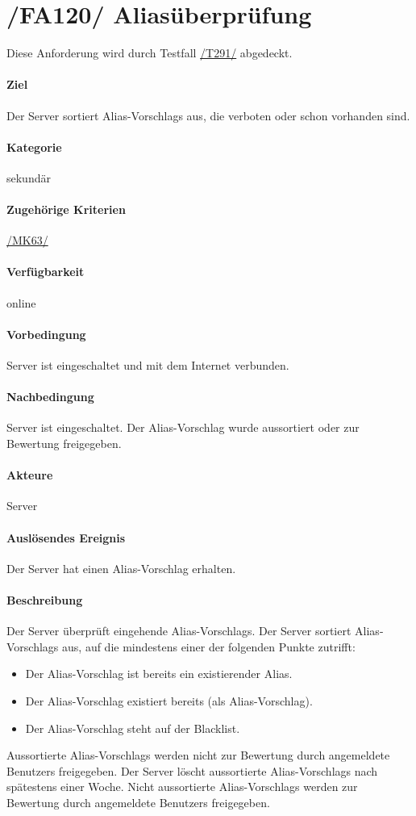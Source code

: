 \section[Aliasüberprüfung]{/FA120/ Aliasüberprüfung}
\label{/FA120/}
Diese Anforderung wird durch Testfall \hyperref[/T291/]{/T291/} abgedeckt.
\paragraph{Ziel}
Der \Gls{Server} sortiert \Glspl{Alias-Vorschlag} aus, die verboten oder schon vorhanden sind.
\paragraph{Kategorie}
sekundär
\paragraph{Zugehörige Kriterien}
\hyperref[/MK63/]{/MK63/}
\paragraph{Verfügbarkeit}
online
\paragraph{Vorbedingung}
\Gls{Server} ist eingeschaltet und mit dem Internet verbunden.
\paragraph{Nachbedingung}
\Gls{Server} ist eingeschaltet. Der \Gls{Alias-Vorschlag} wurde aussortiert oder zur Bewertung freigegeben.
\paragraph{Akteure}
\Gls{Server}
\paragraph{Auslösendes Ereignis}
Der \Gls{Server} hat einen \Gls{Alias-Vorschlag} erhalten.
\paragraph{Beschreibung}
Der \Gls{Server} überprüft eingehende \Glspl{Alias-Vorschlag}. Der \Gls{Server} sortiert \Glspl{Alias-Vorschlag} aus, auf die mindestens einer der folgenden Punkte zutrifft:
\begin{itemize}
    \item Der \Gls{Alias-Vorschlag} ist bereits ein existierender \Gls{Alias}.
    \item Der \Gls{Alias-Vorschlag} existiert bereits (als \Gls{Alias-Vorschlag}).
    \item Der \Gls{Alias-Vorschlag} steht auf der \Gls{Blacklist}.
\end{itemize}
Aussortierte \Glspl{Alias-Vorschlag} werden nicht zur Bewertung durch angemeldete \Glspl{Benutzer} freigegeben. Der \Gls{Server} löscht aussortierte \Glspl{Alias-Vorschlag} nach spätestens einer Woche. Nicht aussortierte \Glspl{Alias-Vorschlag} werden zur Bewertung durch angemeldete \Glspl{Benutzer} freigegeben.
